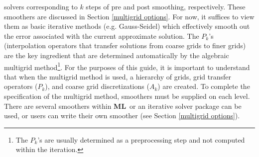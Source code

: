 \documentclass{article}[11pt]
\newcommand{\ML}     {{\bf ML}}
\begin{document}
solvers corresponding to $k$ steps of pre and post smoothing,
respectively. These smoothers are discussed in Section 
\ref{multigrid options}. 
For now, it suffices to view them as basic iterative methods
(e.g. Gauss-Seidel) which effectively smooth out the error associated
with the current approximate solution.  The $P_k$'s (interpolation
operators that transfer solutions from coarse grids to finer grids) are
the key ingredient that are determined automatically by the algebraic
multigrid method\footnote{The $P_k$'s are usually determined as a
  preprocessing step and not computed within the iteration.}. For the
purposes of this guide, it is important to understand that when the
multigrid method is used, a hierarchy of grids, grid transfer operators
($P_k$), and coarse grid discretizations ($A_k$) are created. To
complete the specification of the multigrid method, smoothers must be
supplied on each level.  There are several smoothers within \ML\ or an
iterative solver package can be used, or users can write their own
smoother (see Section \ref{multigrid options}).
%
%
\end{document}
